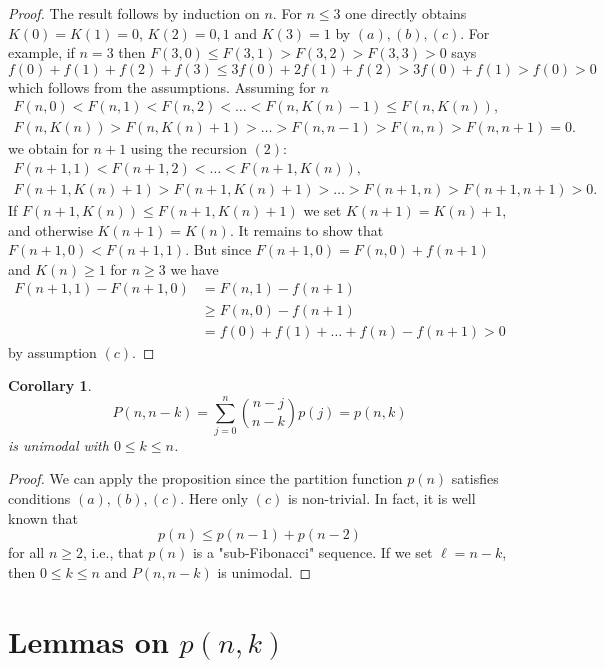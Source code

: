 \documentclass[12pt]{amsart}
\newtheorem{cor}[thm]{Corollary}
\theoremstyle{definition}
\theoremstyle{remark}
\begin{document}
\begin{proof}
The result follows by induction on $n$. For $n\le 3$ one directly obtains
$K(0)=K(1)=0$, $K(2)=0,1$ and $K(3)=1$ by $(a),(b),(c)$. 
For example, if $n=3$ then $F(3,0)\le F(3,1) >F(3,2)>F(3,3)>0$ says
$$f(0)+f(1)+f(2)+f(3)\le 3f(0)+2f(1)+f(2)>3f(0)+f(1)>f(0)>0$$
which follows from the assumptions.
Assuming for $n$ 
\begin{gather*}
F(n,0)<F(n,1)<F(n,2)<\dots <F(n,K(n)-1)\le F(n,K(n)),\\
F(n,K(n)) > F(n,K(n)+1)> \dots >F(n,n-1)>F(n,n)>F(n,n+1)=0.
\end{gather*}   
we obtain for $n+1$ using the recursion $(2)$:
\begin{gather*}
F(n+1,1)<F(n+1,2)<\dots <F(n+1,K(n)),\\
F(n+1,K(n)+1) > F(n+1,K(n)+1)> \dots >F(n+1,n)>F(n+1,n+1)>0.
\end{gather*}    
If $F(n+1,K(n))\le F(n+1,K(n)+1)$ we set $K(n+1)=K(n)+1$, and
otherwise $K(n+1)=K(n)$. It remains to show that $F(n+1,0)<F(n+1,1)$.
But since $F(n+1,0)=F(n,0)+f(n+1)$ and $K(n)\ge 1$ for  $n\ge 3$
we have 
\begin{align*}
F(n+1,1)-F(n+1,0) & = F(n,1)-f(n+1) \\
                  & \ge F(n,0)-f(n+1) \\
                  & =f(0)+f(1)+\dots +f(n)-f(n+1) > 0
\end{align*}
by assumption $(c)$.
\end{proof} 

\begin{cor}\label{uni}
\begin{equation*}
P(n,n-k)=\sum_{j=0}^{n}\binom{n-j}{n-k}p(j)=p(n,k)
\end{equation*}
is unimodal with $0\le k\le n$.      
\end{cor}

\begin{proof}
We can apply the proposition since the partition function $p(n)$ 
satisfies conditions $(a),(b),(c)$.
Here only $(c)$ is non-trivial. In fact, it is well known that
\begin{equation*}
p(n)\le p(n-1)+p(n-2)
\end{equation*}  
for all $n\ge 2$, i.e., that $p(n)$ is a "sub-Fibonacci" sequence.
If we set $\ell =n-k$, then $0\le k\le n$ and 
$P(n,n-k)$ is unimodal.
\end{proof}

\section{Lemmas on $p(n,k)$}
\end{document}
